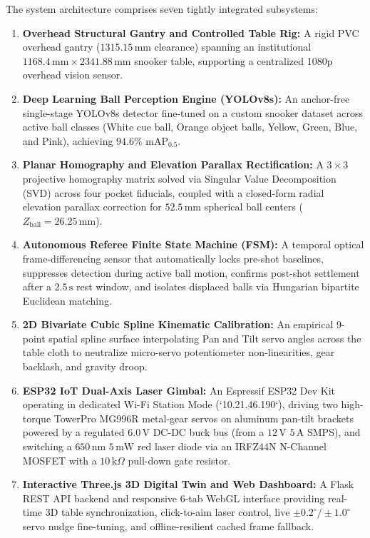 The system architecture comprises seven tightly integrated subsystems:
\begin{enumerate}
    \item \textbf{Overhead Structural Gantry and Controlled Table Rig:} A rigid PVC overhead gantry ($1315.15\,\text{mm}$ clearance) spanning an institutional $1168.4\,\text{mm} \times 2341.88\,\text{mm}$ snooker table, supporting a centralized 1080p overhead vision sensor.
    \item \textbf{Deep Learning Ball Perception Engine (YOLOv8s):} An anchor-free single-stage YOLOv8s detector fine-tuned on a custom snooker dataset across active ball classes (White cue ball, Orange object balls, Yellow, Green, Blue, and Pink), achieving $94.6\%$ $\text{mAP}_{0.5}$.
    \item \textbf{Planar Homography and Elevation Parallax Rectification:} A $3 \times 3$ projective homography matrix solved via Singular Value Decomposition (SVD) across four pocket fiducials, coupled with a closed-form radial elevation parallax correction for $52.5\,\text{mm}$ spherical ball centers ($Z_{\text{ball}} = 26.25\,\text{mm}$).
    \item \textbf{Autonomous Referee Finite State Machine (FSM):} A temporal optical frame-differencing sensor that automatically locks pre-shot baselines, suppresses detection during active ball motion, confirms post-shot settlement after a $2.5\,\text{s}$ rest window, and isolates displaced balls via Hungarian bipartite Euclidean matching.
    \item \textbf{2D Bivariate Cubic Spline Kinematic Calibration:} An empirical 9-point spatial spline surface interpolating Pan and Tilt servo angles across the table cloth to neutralize micro-servo potentiometer non-linearities, gear backlash, and gravity droop.
    \item \textbf{ESP32 IoT Dual-Axis Laser Gimbal:} An Espressif ESP32 Dev Kit operating in dedicated Wi-Fi Station Mode (`10.21.46.190`), driving two high-torque TowerPro MG996R metal-gear servos on aluminum pan-tilt brackets powered by a regulated $6.0\,\text{V}$ DC-DC buck bus (from a $12\,\text{V}$ $5\,\text{A}$ SMPS), and switching a $650\,\text{nm}$ $5\,\text{mW}$ red laser diode via an IRFZ44N N-Channel MOSFET with a $10\,\text{k}\Omega$ pull-down gate resistor.
    \item \textbf{Interactive Three.js 3D Digital Twin and Web Dashboard:} A Flask REST API backend and responsive 6-tab WebGL interface providing real-time 3D table synchronization, click-to-aim laser control, live $\pm 0.2^\circ / \pm 1.0^\circ$ servo nudge fine-tuning, and offline-resilient cached frame fallback.
\end{enumerate}

